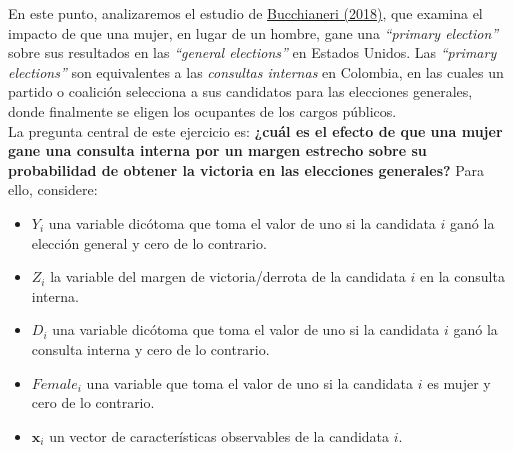 \documentclass[a4paper, answers, addpoints, 11pt]{exam}
\begin{document}
En este punto, analizaremos el estudio de \href{https://link.springer.com/article/10.1007/s11109-017-9407-7}{Bucchianeri (2018)}, que examina el impacto de que una mujer, en lugar de un hombre, gane una \textit{``primary election''} sobre sus resultados en las \textit{``general elections''} en Estados Unidos. Las \textit{``primary elections''} son equivalentes a las \textit{consultas internas} en Colombia, en las cuales un partido o coalición selecciona a sus candidatos para las elecciones generales, donde finalmente se eligen los ocupantes de los cargos públicos. \\

La pregunta central de este ejercicio es: \textbf{¿cuál es el efecto de que una mujer gane una consulta interna por un margen estrecho sobre su probabilidad de obtener la victoria en las elecciones generales?} Para ello, considere: \\

\begin{itemize}
    \item $Y_i$ una variable dicótoma que toma el valor de uno si la candidata $i$ ganó la elección general y cero de lo contrario.

    \item $Z_i$ la variable del margen de victoria/derrota de la candidata $i$ en la consulta interna.
    
    \item $D_i$ una variable dicótoma que toma el valor de uno si la candidata $i$ ganó la consulta interna y cero de lo contrario.

    \item $Female_i$ una variable que toma el valor de uno si la candidata $i$ es mujer y cero de lo contrario.

    \item $\textbf{x}_i$ un vector de características observables de la candidata $i$.
\end{itemize}
\end{document}
